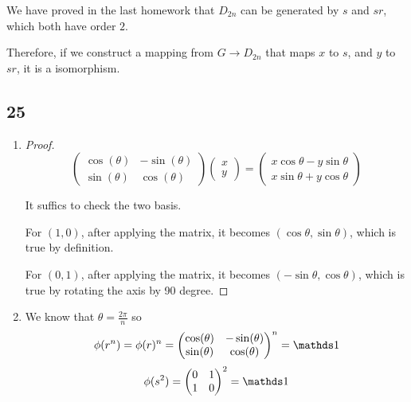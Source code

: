 We have proved in the last homework that $D_{2n}$ can be generated by
$s$ and $sr$, which both have order $2$.

Therefore, if we construct a mapping from $G\to D_{2n}$ that maps $x$ to $s$,
and $y$ to $sr$, it is a isomorphism.

\subsection*{25}

\begin{enumerate}
	\item \begin{proof}
		      $$
			      \begin{pmatrix}
				      \cos (\theta) & -\sin(\theta) \\
				      \sin (\theta) & \cos(\theta)
			      \end{pmatrix}
			      \begin{pmatrix}
				      x \\
				      y
			      \end{pmatrix} =
			      \begin{pmatrix}
				      x \cos \theta - y \sin \theta \\
				      x \sin \theta + y \cos \theta
			      \end{pmatrix}
		      $$

		      It suffics to check the two basis.

		      For $(1,0)$, after applying the matrix,
		      it becomes $(\cos \theta, \sin \theta)$, which is true by definition.

		      For $(0,1)$, after applying the matrix,
		      it becomes $(-\sin \theta, \cos \theta)$, which is true by rotating the axis by 90 degree.

	      \end{proof}
	\item We know that $\theta=\frac{2\pi}{n}$ so
	      $$
		      \phi(r^n) = \phi(r)^n = \begin{pmatrix}
			      \cos (\theta) & -\sin(\theta) \\
			      \sin (\theta) & \cos(\theta)
		      \end{pmatrix}^n = \one
	      $$
	      $$
		      \phi(s^2) = \begin{pmatrix}
			      0 & 1 \\
			      1 & 0
		      \end{pmatrix}^2 = \one
	      $$


\end{enumerate}

